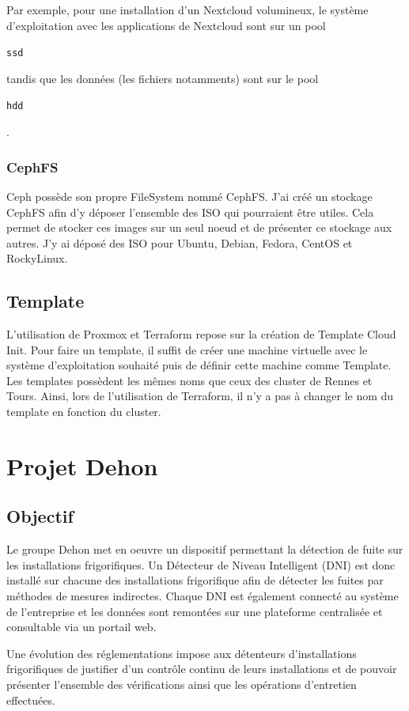 \documentclass[12pt, a4paper, twoside]{article}
\begin{document}
Par exemple, pour une installation d'un \gls{Nextcloud} volumineux, le système d'exploitation avec les applications de \gls{Nextcloud} sont sur un pool \begin{code}\texttt{ssd}\end{code} tandis que les données (les fichiers notamments) sont sur le pool \begin{code}\texttt{hdd}\end{code}.

\subsubsection{CephFS}
\gls{Ceph} possède son propre \gls{FileSystem} nommé CephFS.
J'ai créé un stockage CephFS afin d'y déposer l'ensemble des \gls{ISO} qui pourraient être utiles.
Cela permet de stocker ces images sur un seul noeud et de présenter ce stockage aux autres.
J'y ai déposé des \gls{ISO} pour Ubuntu, Debian, Fedora, CentOS et RockyLinux.

\subsection{Template}
L'utilisation de \gls{Proxmox} et \gls{Terraform} repose sur la création de Template Cloud Init.
Pour faire un template, il suffit de créer une machine virtuelle avec le système d'exploitation souhaité puis de définir cette machine comme Template.
Les templates possèdent les mêmes noms que ceux des \gls{cluster} de Rennes et Tours.
Ainsi, lors de l'utilisation de Terraform, il n'y a pas à changer le nom du template en fonction du cluster.

\newpage
\section{Projet Dehon} \label{dehon}
\subsection{Objectif}
Le groupe Dehon met en oeuvre un dispositif permettant la détection de fuite sur les installations frigorifiques. 
Un Détecteur de Niveau Intelligent (\gls{DNI}) est donc installé sur chacune des installations frigorifique afin de détecter les fuites par méthodes de mesures indirectes.
Chaque DNI est également connecté au système de l'entreprise et les données sont remontées sur une plateforme centralisée et consultable via un portail web. 

Une évolution des réglementations impose aux détenteurs d'installations frigorifiques de justifier d'un contrôle continu de leurs installations et de pouvoir présenter l'ensemble des vérifications ainsi que les opérations d'entretien effectuées.
\end{document}
